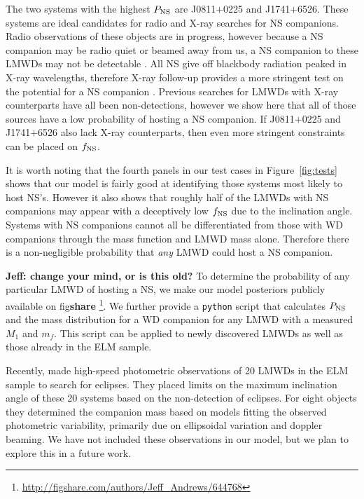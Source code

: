 \documentclass[apjl]{emulateapj}
\newcommand{\mf}{m_f}
\begin{document}
The two systems with the highest $P_{\rm NS}$ are J0811$+$0225 and J1741$+$6526. These systems are ideal candidates for radio and X-ray searches for NS companions. Radio observations of these objects are in progress, however because a NS companion may be radio quiet or beamed away from us, a NS companion to these LMWDs may not be detectable \citep{vLeeuwen07}. All NS give off blackbody radiation peaked in X-ray wavelengths, therefore X-ray follow-up provides a more stringent test on the potential for a NS companion \citep{agueros09a}. Previous searches for LMWDs with X-ray counterparts have all been non-detections, however we show here that all of those sources have a low probability of hosting a NS companion. If J0811$+$0225 and J1741$+$6526 also lack X-ray counterparts, then even more stringent constraints can be placed on $f_{\rm NS}$. %


It is worth noting that the fourth panels in our test cases in Figure~\ref{fig:tests} shows that our model is fairly good at identifying those systems most likely to host NS's. However it also shows that roughly half of the LMWDs with NS companions may appear with a deceptively low $f_{\rm NS}$ due to the inclination angle. Systems with NS companions cannot all be differentiated from those with WD companions through the mass function and LMWD mass alone. Therefore there is a non-negligible probability that {\it any} LMWD could host a NS companion.

{\bf Jeff: change your mind, or is this old?}
To determine the probability of any particular LMWD of hosting a NS, we make our model posteriors publicly available on fig{\bf share} \footnote{\url{http://figshare.com/authors/Jeff\_Andrews/644768}}. We further provide a {\tt python} script that calculates $P_{\rm NS}$ and the mass distribution for a WD companion for any LMWD with a measured $M_1$ and $\mf$. This script can be applied to newly discovered LMWDs as well as those already in the ELM sample.


Recently, \citet{hermes14} made high-speed photometric observations of 20 LMWDs in the ELM sample to search for eclipses. They placed limits on the maximum inclination angle of these 20 systems based on the non-detection of eclipses. For eight objects they determined the companion mass based on models fitting the observed photometric variability, primarily due on ellipsoidal variation and doppler beaming. We have not included these observations in our model, but we plan to explore this in a future work.
\end{document}
